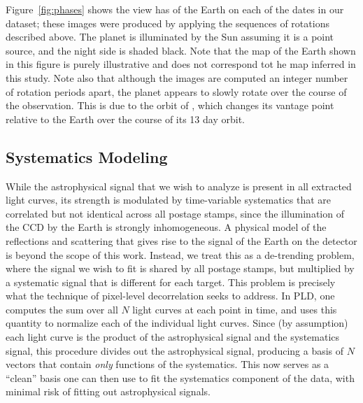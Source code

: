\documentclass[modern]{aastex62}
\begin{document}
Figure~\ref{fig:phases} shows the view \TESS has of the Earth on each of the dates
in our dataset; these images were produced by applying the sequences of rotations
described above. The planet is illuminated by the Sun assuming it is a point source,
and the night side is shaded black. Note that the map of the Earth shown in this figure is
purely illustrative and does not correspond tot he map inferred in this study.
Note also that although the images are computed an integer number of rotation periods
apart, the planet appears to slowly rotate over the course of the observation.
This is due to the orbit of \TESS, which changes its vantage point relative
to the Earth over the course of its 13 day orbit.

\subsection{Systematics Modeling}
\label{sec:systematics}

While the astrophysical signal that we wish to analyze is present in all 
extracted light curves, its strength is modulated by time-variable systematics 
that are correlated but not identical across all postage stamps, since the
illumination of the CCD by the Earth is strongly inhomogeneous. A physical
model of the reflections and scattering that gives rise to the
signal of the Earth on the \TESS detector is beyond the scope of this work. Instead,
we treat this as a de-trending problem, where the signal we wish to fit is
shared by all postage stamps, but multiplied by a systematic signal that is
different for each target. This problem is precisely what the technique of
pixel-level decorrelation \citep[PLD;][]{Deming2015, Luger2016, Luger2018a}
seeks to address. In PLD, one computes the sum over all $N$ light curves at each
point in time, and uses this quantity to normalize each of the individual
light curves. Since (by assumption) each light curve is the product of the astrophysical
signal and the systematics signal, this procedure divides out the astrophysical
signal, producing a basis of $N$ vectors that contain \emph{only} functions of the
systematics. This now serves as a ``clean'' basis one can then use to fit the 
systematics component of the data, with minimal risk of fitting out astrophysical signals. 
\end{document}
